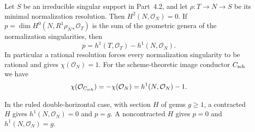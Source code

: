 
\begin{proposition}[P4.33]\hypertarget{tag-02X6}{}\label{night:P4.33}\label{stmt:P4.33}


Let $S$ be an irreducible singular support in Part~4.2, and let
$\rho:T\to N\to S$ be its minimal normalization resolution.
Then $H^2(N,\mathcal O_N)=0$. If
$p=\dim H^0(N,R^1\rho_{N*}\mathcal O_T)$ is the sum of the
geometric genera of the normalization singularities, then
\[
 p=h^1(T,\mathcal O_T)-h^1(N,\mathcal O_N).
\]
In particular a rational resolution forces every normalization
singularity to be rational and gives $\chi(\mathcal O_N)=1$.
For the scheme-theoretic image conductor $C_{\rm sch}$ we have
\[
 \chi(\mathcal O_{C_{\rm sch}})
   =-\chi(\mathcal O_N)=h^1(N,\mathcal O_N)-1.
\]

In the ruled double-horizontal case, with section $H$ of genus
$g\ge1$, a contracted $H$ gives $h^1(N,\mathcal O_N)=0$ and
$p=g$. A noncontracted $H$ gives $p=0$ and
$h^1(N,\mathcal O_N)=g$.
\end{proposition}

